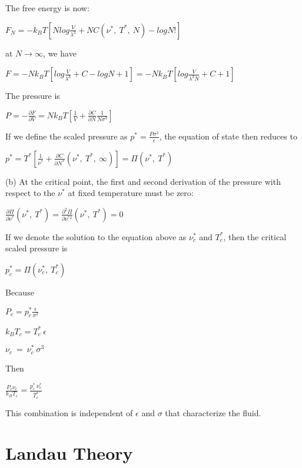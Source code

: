 \documentclass[12pt,titlepage]{article}
\numberwithin{equation}{section}
\begin{document}
The free energy is now:

$\displaystyle F_{N} =-k_{B} T\left[ Nlog\frac{V}{\lambda ^{3}} +NC\left( \nu ^{*} ,\ T^{*} ,\ N\right) -logN!\right]$

at $\displaystyle N\rightarrow \infty $, we have

$\displaystyle F=-Nk_{B} T\left[ log\frac{V}{\lambda ^{3}} +C-logN+1\right] =-Nk_{B} T\left[ log\frac{V}{\lambda ^{3} N} +C+1\right]$

The pressure is

$\displaystyle P=-\frac{\partial F}{\partial V} =Nk_{B} T\left[\frac{1}{V} +\frac{\partial C}{\partial N}\frac{1}{N\sigma ^{3}}\right]$

If we define the scaled pressure as $\displaystyle p^{*} =\frac{P\sigma ^{3}}{\epsilon }$, the equation of state then reduces to

$\displaystyle p^{*} =T^{*}\left[\frac{1}{\nu ^{*}} +\frac{\partial C}{\partial N^{*}}\left( \nu ^{*} ,\ T^{*} ,\ \infty \right)\right] =\Pi \left( \nu ^{*} ,\ T^{*}\right)$

(b) At the critical point, the first and second derivation of the pressure with respect to the $\nu^*$ at fixed temperature must be zero:

$\displaystyle \frac{\partial \Pi }{\partial \nu ^{*}}\left( \nu ^{*} ,\ T^{*}\right) =\frac{\partial ^{2} \Pi }{\partial \nu ^{*2}}\left( \nu ^{*} ,\ T^{*}\right) =0$

If we denote the solution to the equation above as $\displaystyle \nu ^{*}_{c}$ and $\displaystyle T^{*}_{c}$, then the critical scaled pressure is 

$\displaystyle p^{*}_{c} =\Pi \left( \nu ^{*}_{c} ,\ T^{*}_{c}\right)$

Because

$\displaystyle P_{c} =p^{*}_{c}\frac{\epsilon }{\sigma ^{3}}$

$k_{B} T_{c} =T^{*}_{c} \ \epsilon$

$\nu _{c} \ =\ \nu ^{*}_{c} \ \sigma ^{3}$

Then

$\displaystyle \frac{P_{c} \nu _{c}}{k_{B} T_{c}} =\frac{p^{*}_{c} \ \nu ^{*}_{c}}{T^{*}_{c}}$

This combination is independent of $\epsilon$ and $\sigma$ that characterize the fluid.

\section{Landau Theory}
\end{document}
